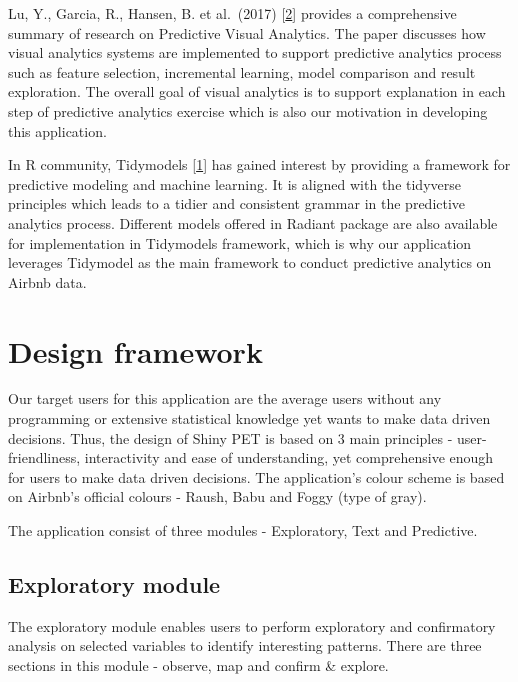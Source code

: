 \documentclass{acm_proc_article-sp}
\begin{document}
Lu, Y., Garcia, R., Hansen, B. et al.~(2017)
{[}\protect\hyperlink{ref-https:ux2fux2fdoi.orgux2f10.1111ux2fcgf.13210}{2}{]}
provides a comprehensive summary of research on Predictive Visual
Analytics. The paper discusses how visual analytics systems are
implemented to support predictive analytics process such as feature
selection, incremental learning, model comparison and result
exploration. The overall goal of visual analytics is to support
explanation in each step of predictive analytics exercise which is also
our motivation in developing this application.

In R community, Tidymodels
{[}\protect\hyperlink{ref-tidymodels2020}{1}{]} has gained interest by
providing a framework for predictive modeling and machine learning. It
is aligned with the tidyverse principles which leads to a tidier and
consistent grammar in the predictive analytics process. Different models
offered in Radiant package are also available for implementation in
Tidymodels framework, which is why our application leverages Tidymodel
as the main framework to conduct predictive analytics on Airbnb data.

\hypertarget{design-framework}{%
\section{Design framework}\label{design-framework}}

Our target users for this application are the average users without any
programming or extensive statistical knowledge yet wants to make data
driven decisions. Thus, the design of Shiny PET is based on 3 main
principles - user-friendliness, interactivity and ease of understanding,
yet comprehensive enough for users to make data driven decisions. The
application's colour scheme is based on Airbnb's official colours -
Raush, Babu and Foggy (type of gray).

The application consist of three modules - Exploratory, Text and
Predictive.

\hypertarget{exploratory-module}{%
\subsection{Exploratory module}\label{exploratory-module}}

The exploratory module enables users to perform exploratory and
confirmatory analysis on selected variables to identify interesting
patterns. There are three sections in this module - observe, map and
confirm \& explore.
\end{document}
